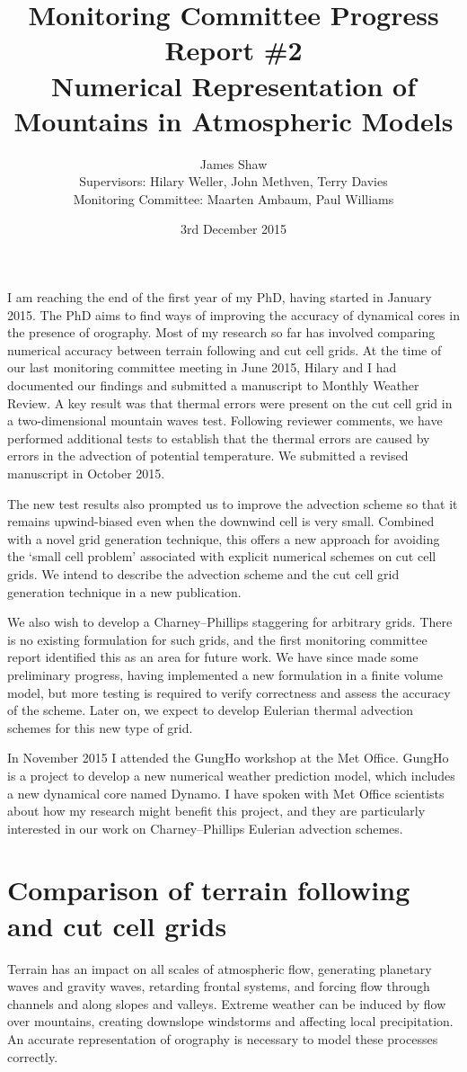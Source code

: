 \documentclass[a4paper]{article}
\title{Monitoring Committee Progress Report \#2\\
\vspace*{1em}
\Large{Numerical Representation of Mountains in Atmospheric Models}}
\author{James Shaw
\vspace{0.5em} \\
\large{Supervisors: Hilary Weller, John Methven, Terry Davies}
\vspace{0.5em} \\
\large{Monitoring Committee: Maarten Ambaum, Paul Williams}}
\date{3rd December 2015}
\begin{document}
\newcommand{\exner}{\Pi}
\newcommand{\TODO}[1]{\textcolor{purple}{TODO: \emph{#1}}}
\maketitle


I am reaching the end of the first year of my PhD, having started in January 2015.
The PhD aims to find ways of improving the accuracy of dynamical cores in the presence of orography.
Most of my research so far has involved comparing numerical accuracy between terrain following and cut cell grids.
At the time of our last monitoring committee meeting in June 2015, Hilary and I had documented our findings and submitted a manuscript to Monthly Weather Review.  A key result was that thermal errors were present on the cut cell grid in a two-dimensional mountain waves test.  Following reviewer comments, we have performed additional tests to establish that the thermal errors are caused by errors in the advection of potential temperature.  We submitted a revised manuscript in October 2015.

The new test results also prompted us to improve the advection scheme so that it remains upwind-biased even when the downwind cell is very small.  Combined with a novel grid generation technique, this offers a new approach for avoiding the `small cell problem' associated with explicit numerical schemes on cut cell grids.  We intend to describe the advection scheme and the cut cell grid generation technique in a new publication.

We also wish to develop a Charney--Phillips staggering for arbitrary grids.  There is no existing formulation for such grids, and the first monitoring committee report identified this as an area for future work.  We have since made some preliminary progress, having implemented a new formulation in a finite volume model, but more testing is required to verify correctness and assess the accuracy of the scheme.  Later on, we expect to develop Eulerian thermal advection schemes for this new type of grid.

In November 2015 I attended the GungHo workshop at the Met Office.  GungHo is a project to develop a new numerical weather prediction model, which includes a new dynamical core named Dynamo.  I have spoken with Met Office scientists about how my research might benefit this project, and they are particularly interested in our work on Charney--Phillips Eulerian advection schemes.

\section{Comparison of terrain following and cut cell grids}
Terrain has an impact on all scales of atmospheric flow, generating planetary waves and gravity waves, retarding frontal systems, and forcing flow through channels and along slopes and valleys.  Extreme weather can be induced by flow over mountains, creating downslope windstorms and affecting local precipitation.  An accurate representation of orography is necessary to model these processes correctly.
\end{document}
